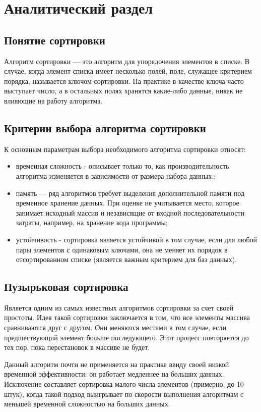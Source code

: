 \chapter{Аналитический раздел}

\section{Понятие сортировки}
Алгоритм сортировки — это алгоритм для упорядочения элементов в списке. В случае, когда элемент списка имеет несколько полей, поле, служащее критерием порядка, называется ключом сортировки. На практике в качестве ключа часто выступает число, а в остальных полях хранятся какие-либо данные, никак не влияющие на работу алгоритма.

\section{Критерии выбора алгоритма сортировки}
К основным параметрам выбора необходимого алгоритма сортировки относят:
\begin{itemize}
	\item временная сложность - описывает только то, как производительность алгоритма изменяется в зависимости от размера набора данных.;
	\item память — ряд алгоритмов требует выделения дополнительной памяти под временное хранение данных. При оценке не учитывается место, которое занимает исходный массив и независящие от входной последовательности затраты, например, на хранение кода программы;
	\item устойчивость - сортировка является устойчивой в том случае, если для любой пары элементов с одинаковым ключами, она не меняет их порядок в отсортированном списке (является важным критерием для баз данных).
\end{itemize} 

\section{Пузырьковая сортировка}
Является одним из самых известных алгоритмов сортировки за счет своей простоты. Идея такой сортировки заключается в том, что все элементы массива сравниваются друг с другом. Они меняются местами в том случае, если предшествующий элемент больше последующего. Этот процесс повторяется до тех пор, пока перестановок в массиве не будет.

Данный алгоритм почти не применяется на практике ввиду своей низкой временной эффективности: он работает медленнее на больших данных. Исключение составляет сортировка малого числа элементов (примерно, до 10 штук), когда такой подход выигрывает по скорости выполнения алгоритмам с меньшей временной сложностью на больших данных.

